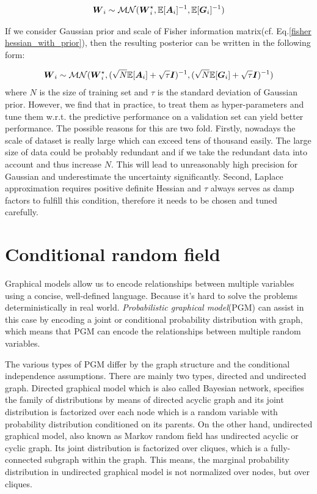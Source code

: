 \begin{equation}
\begin{aligned} \label{mvg}
\boldsymbol W_{i} \sim \mathcal{MN}(\boldsymbol W_i^\star, \mathbb E[\boldsymbol A_i]^{-1}, \mathbb E[\boldsymbol G_i]^{-1})
\end{aligned}
\end{equation}

If we consider Gaussian prior and scale of Fisher information matrix(cf. Eq.\ref{fisher hessian_with_prior}), then the resulting posterior can be written in the following form:

\begin{equation}
\begin{aligned} \label{mvg_prior}
\boldsymbol W_{i} \sim \mathcal{MN}(\boldsymbol W_i^\star, (\sqrt{N} \mathbb E[\boldsymbol A_i]+\sqrt{\tau}\boldsymbol I)^{-1}, (\sqrt{N}\mathbb E[\boldsymbol G_i]+\sqrt{\tau}\boldsymbol I)^{-1})
\end{aligned}
\end{equation} 
where $N$ is the size of training set and $\tau$ is the standard deviation of Gaussian prior.
However, we find that in practice, to treat them as hyper-parameters and tune them w.r.t. the predictive performance on a validation set can yield better performance. The possible reasons for this are two fold. Firstly, nowadays the scale of dataset is really large which can exceed tens of thousand easily. The large size of data could be probably redundant and if we take the redundant data into account and thus increase $N$. This will lead to unreasonably high precision for Gaussian and underestimate the uncertainty significantly. Second, Laplace approximation requires positive definite Hessian and $\tau$ always serves as damp factors to fulfill this condition, therefore it needs to be chosen and tuned carefully.    


\section{Conditional random field}
Graphical models allow us to encode relationships between multiple variables using a concise, well-defined language. Because it's hard to solve the problems deterministically in real world. \textit{Probabilistic graphical model}(PGM)\cite{koller2009probabilistic} can assist in this case by encoding a joint or conditional probability distribution with graph, which means that PGM can encode the relationships between multiple random variables. 

The various types of PGM differ by the graph structure and the conditional independence assumptions. There are mainly two types, directed and undirected graph. Directed graphical model which is also called Bayesian network, specifies the family of distributions by means of directed acyclic graph and its joint distribution is factorized over each node which is a random variable with probability distribution conditioned on its parents. On the other hand, undirected graphical model, also known as Markov random field has undirected acyclic or cyclic graph. Its joint distribution is factorized over cliques, which is a fully-connected subgraph within the graph. This means, the marginal probability distribution in undirected graphical model is not normalized over nodes, but over cliques. 

